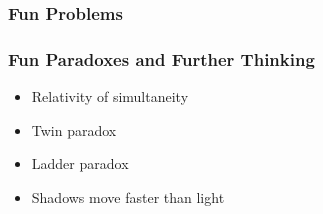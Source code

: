 \documentclass[10pt]{beamer}
\begin{document}
\begin{frame}
  \frametitle{Fun Problems}
  \begin{figure}[!tbp]
    \centering
    \hfill
  \end{figure}
\end{frame}

\begin{frame}
  \frametitle{Fun Paradoxes and Further Thinking}
  \begin{itemize}
  \item Relativity of simultaneity
  \item Twin paradox
  \item Ladder paradox
  \item Shadows move faster than light
  \end{itemize}
\end{frame}
\end{document}
